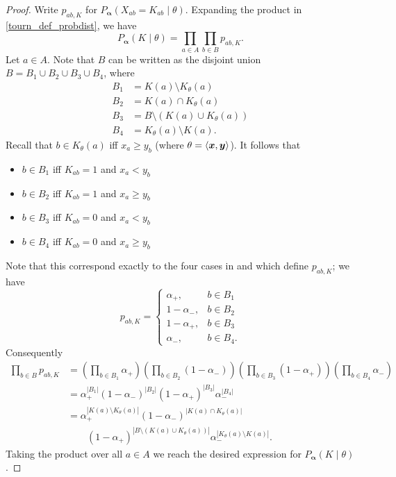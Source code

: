 \begin{proof}
    Write $p_{ab,K}$ for $P_{\bm{\alpha}}(X_{ab} = K_{ab} \mid \theta)$.
    Expanding the product in \cref{tourn_def_probdist}, we have
    \[
       P_{\bm{\alpha}}(K \mid \theta)
       = \prod_{a \in A}{\prod_{b \in B}{p_{ab,K}}}.
    \]
    Let $a \in A$. Note that $B$ can be written as the disjoint
    union $B = B_1 \cup B_2 \cup B_3 \cup B_4$, where
    \[
       \begin{aligned}
          B_1 &= K(a) \setminus K_\theta(a) \\
          B_2 &= K(a) \cap K_\theta(a) \\
          B_3 &= B \setminus (K(a) \cup K_\theta(a)) \\
          B_4 &= K_\theta(a) \setminus K(a).
       \end{aligned}
    \]
    Recall that $b \in K_\theta(a)$ iff $x_a \ge y_b$
    (where $\theta = \langle{\bm{x}, \bm{y}}\rangle$).  It follows that
    \begin{itemize}
        \item $b \in B_1$ iff $K_{ab} = 1$ and $x_a < y_b$
        \item $b \in B_2$ iff $K_{ab} = 1$ and $x_a \ge y_b$
        \item $b \in B_3$ iff $K_{ab} = 0$ and $x_a < y_b$
        \item $b \in B_4$ iff $K_{ab} = 0$ and $x_a \ge y_b$
    \end{itemize}
    Note that this correspond exactly to the four cases in
     and
     which define $p_{ab, K}$; we have
    \[
        p_{ab,K} = \begin{cases}
            \alpha_+,& b \in B_1 \\
            1 - \alpha_-,& b \in B_2 \\
            1 - \alpha_+,& b \in B_3 \\
            \alpha_-,& b \in B_4.
        \end{cases}
    \]
    Consequently
    \[
       \begin{aligned}
           \prod_{b \in B}{p_{ab,K}}
           &=
               \left(\prod_{b \in B_1}{\alpha_+}\right)
               \left(\prod_{b \in B_2}{(1-\alpha_-)}\right)
               \left(\prod_{b \in B_3}{(1-\alpha_+)}\right)
               \left(\prod_{b \in B_4}{\alpha_-}\right)
           \\
           &= \alpha_+^{|B_1|} (1-\alpha_-)^{|B_2|} (1-\alpha_+)^{|B_3|}
              \alpha_-^{|B_4|} \\
           &= \alpha_+^{|K(a) \setminus K_\theta(a)|}
              (1-\alpha_-)^{|K(a) \cap K_\theta(a)|}
              \\
           &\quad \quad (1-\alpha_+)^{|B \setminus (K(a) \cup K_\theta(a))|}
              \alpha_-^{|K_\theta(a) \setminus K(a)|}.
       \end{aligned}
    \]
    Taking the product over all $a \in A$ we reach the desired
    expression for $P_{\bm{\alpha}}(K \mid \theta)$.
\end{proof}


